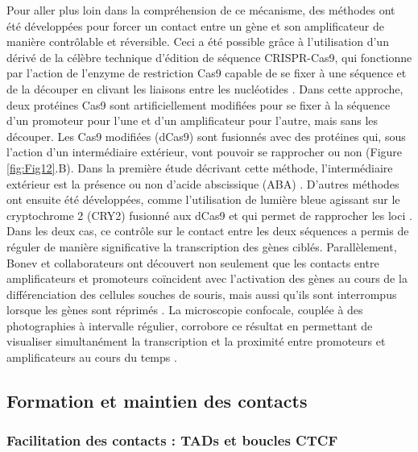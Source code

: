 Pour aller plus loin dans la compréhension de ce mécanisme, des méthodes ont été développées pour forcer un contact entre un gène et son \gls{amplificateur} de manière contrôlable et réversible. Ceci a été possible grâce à l’utilisation d’un dérivé de la célèbre technique d’édition de séquence CRISPR-Cas9, qui fonctionne par l’action de l’enzyme de restriction Cas9 capable de se fixer à une séquence et de la découper en clivant les liaisons entre les nucléotides \citep{doudna_new_2014}. Dans cette approche, deux protéines Cas9 sont artificiellement modifiées pour se fixer à la séquence d’un promoteur pour l’une et d’un \gls{amplificateur} pour l’autre, mais sans les découper. Les Cas9 modifiées (dCas9) sont fusionnés avec des protéines qui, sous l’action d’un intermédiaire extérieur, vont pouvoir se rapprocher ou non (Figure \ref{fig:Fig12}.B). Dans la première étude décrivant cette méthode, l’intermédiaire extérieur est la présence ou non d’acide abscissique (ABA) \citep{morgan_manipulation_2017}. D’autres méthodes ont ensuite été développées, comme l’utilisation de lumière bleue agissant sur le cryptochrome 2 (CRY2) fusionné aux dCas9 et qui permet de rapprocher les loci \citep{kim_ladl_2019}. Dans les deux cas, ce contrôle sur le contact entre les deux séquences a permis de réguler de manière significative la transcription des gènes ciblés. Parallèlement, Bonev et collaborateurs ont découvert non seulement que les contacts entre \glspl{amplificateur} et promoteurs coïncident avec l'activation des gènes au cours de la différenciation des cellules souches de souris, mais aussi qu'ils sont interrompus lorsque les gènes sont réprimés \citep{bonev_multiscale_2017}. La microscopie confocale, couplée à des photographies à intervalle régulier, corrobore ce résultat en permettant de visualiser simultanément la transcription et la proximité entre promoteurs et \glspl{amplificateur} au cours du temps \citep{chen_dynamic_2018}.

\subsection{Formation et maintien des contacts}
\label{subsec:formation-contact}
\subsubsection{Facilitation des contacts : \acrshort{TAD}s et boucles CTCF}
\label{subsubsec:TAD-boucle}

